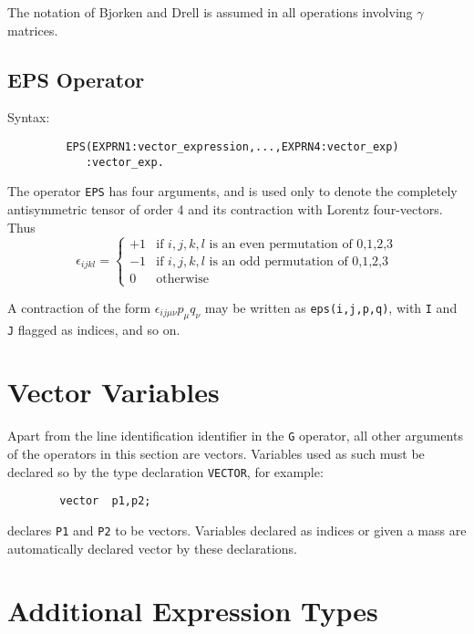 The notation of Bjorken and Drell is assumed in all operations involving
$\gamma$ matrices.

\subsection{EPS Operator}
\hypertarget{operator:EPS}{}
Syntax:
\begin{verbatim}
         EPS(EXPRN1:vector_expression,...,EXPRN4:vector_exp)
            :vector_exp.
\end{verbatim}
The operator \texttt{EPS} has four arguments, and is used only to denote the
completely antisymmetric tensor of order 4 and its contraction with Lorentz
four-vectors. Thus
\[ \epsilon_{i j k l} = \left\{ \begin{array}{cl}
                                +1 & \mbox{if $i,j,k,l$ is an even permutation
                                              of 0,1,2,3} \\
                                -1 & \mbox{if $i,j,k,l$ is an odd permutation
                                              of 0,1,2,3} \\
                                0 & \mbox{otherwise}
                              \end{array}
                      \right. \]

A contraction of the form $\epsilon_{i j \mu \nu}p_{\mu}q_{\nu}$ may be
written as \texttt{eps(i,j,p,q)}, with \texttt{I} and \texttt{J} flagged as indices,
and so on.

\section{Vector Variables}
\hypertarget{command:VECTOR}{}

Apart from the line identification identifier in the \texttt{G} operator, all
other arguments of the operators in this section are vectors.  Variables
used as such must be declared so by the type declaration \texttt{VECTOR},
 for example:
\begin{verbatim}
        vector  p1,p2;
\end{verbatim}
declares \texttt{P1} and \texttt{P2} to be vectors.  Variables declared as
indices or given a mass are automatically declared
vector by these declarations.

\section{Additional Expression Types}

